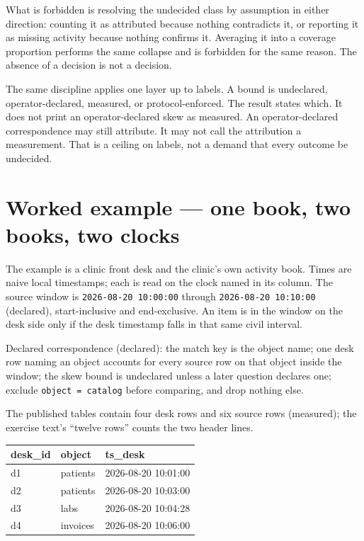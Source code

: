 \documentclass[11pt]{article}
\begin{document}
What is forbidden is resolving the undecided class by assumption in either direction: counting it as attributed because nothing contradicts it, or reporting it as missing activity because nothing confirms it. Averaging it into a coverage proportion performs the same collapse and is forbidden for the same reason. The absence of a decision is not a decision.

The same discipline applies one layer up to labels. A bound is undeclared, operator-declared, measured, or protocol-enforced. The result states which. It does not print an operator-declared skew as measured. An operator-declared correspondence may still attribute. It may not call the attribution a measurement. That is a ceiling on labels, not a demand that every outcome be undecided.

\section{Worked example --- one book, two books, two clocks}

The example is a clinic front desk and the clinic's own activity book. Times are naive local timestamps; each is read on the clock named in its column. The source window is \texttt{2026-08-20 10:00:00} through \texttt{2026-08-20 10:10:00} (declared), start-inclusive and end-exclusive. An item is in the window on the desk side only if the desk timestamp falls in that same civil interval.

Declared correspondence (declared): the match key is the object name; one desk row naming an object accounts for every source row on that object inside the window; the skew bound is undeclared unless a later question declares one; exclude \texttt{object = catalog} before comparing, and drop nothing else.

The published tables contain four desk rows and six source rows (measured); the exercise text's ``twelve rows'' counts the two header lines.

\begin{tabular}{lll}
\toprule
desk\_id & object & ts\_desk \\
\midrule
d1 & patients & 2026-08-20 10:01:00 \\
d2 & patients & 2026-08-20 10:03:00 \\
d3 & labs & 2026-08-20 10:04:28 \\
d4 & invoices & 2026-08-20 10:06:00 \\
\bottomrule
\end{tabular}
\end{document}
